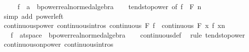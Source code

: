 \begin{isabellebody}
\ \ \ \ \ f\ {\isacharcolon}{\kern0pt}{\isacharcolon}{\kern0pt}\ {\isachardoublequoteopen}{\isacharprime}{\kern0pt}a\ {\isasymRightarrow}\ {\isacharprime}{\kern0pt}b{\isacharcolon}{\kern0pt}{\isacharcolon}{\kern0pt}{\isacharbraceleft}{\kern0pt}power{\isacharcomma}{\kern0pt}real{\isacharunderscore}{\kern0pt}normed{\isacharunderscore}{\kern0pt}algebra{\isacharunderscore}{\kern0pt}{}{\isacharbraceright}{\kern0pt}{\isachardoublequoteclose}\isanewline
%
\isadelimproof
\ \ %
\endisadelimproof
%
\isatagproof
{}\isamarkupfalse%
\ tendsto{\isacharunderscore}{\kern0pt}power\ {\isacharbrackleft}{\kern0pt}of\ f\ {}\ F\ n{\isacharbrackright}{\kern0pt}\ \isamarkupfalse%
\ {\isacharparenleft}{\kern0pt}simp\ add{\isacharcolon}{\kern0pt}\ power{\isacharunderscore}{\kern0pt}{}{\isacharunderscore}{\kern0pt}left{\isacharparenright}{\kern0pt}%
\endisatagproof
{\isafoldproof}%
%
\isadelimproof
\isanewline
%
\endisadelimproof
\isanewline
{}\isamarkupfalse%
\ continuous{\isacharunderscore}{\kern0pt}power\ {\isacharbrackleft}{\kern0pt}continuous{\isacharunderscore}{\kern0pt}intros{\isacharbrackright}{\kern0pt}{\isacharcolon}{\kern0pt}\ {\isachardoublequoteopen}continuous\ F\ f\ {\isasymLongrightarrow}\ continuous\ F\ {\isacharparenleft}{\kern0pt}{\isasymlambda}x{\isachardot}{\kern0pt}\ {\isacharparenleft}{\kern0pt}f\ x{\isacharparenright}{\kern0pt}{\isacharcircum}{\kern0pt}n{\isacharparenright}{\kern0pt}{\isachardoublequoteclose}\isanewline
\ \ \ f\ {\isacharcolon}{\kern0pt}{\isacharcolon}{\kern0pt}\ {\isachardoublequoteopen}{\isacharprime}{\kern0pt}a{\isacharcolon}{\kern0pt}{\isacharcolon}{\kern0pt}t{}{\isacharunderscore}{\kern0pt}space\ {\isasymRightarrow}\ {\isacharprime}{\kern0pt}b{\isacharcolon}{\kern0pt}{\isacharcolon}{\kern0pt}{\isacharbraceleft}{\kern0pt}power{\isacharcomma}{\kern0pt}real{\isacharunderscore}{\kern0pt}normed{\isacharunderscore}{\kern0pt}algebra{\isacharbraceright}{\kern0pt}{\isachardoublequoteclose}\isanewline
%
\isadelimproof
\ \ %
\endisadelimproof
%
\isatagproof
{}\isamarkupfalse%
\ continuous{\isacharunderscore}{\kern0pt}def\ \isamarkupfalse%
\ {\isacharparenleft}{\kern0pt}rule\ tendsto{\isacharunderscore}{\kern0pt}power{\isacharparenright}{\kern0pt}%
\endisatagproof
{\isafoldproof}%
%
\isadelimproof
\isanewline
%
\endisadelimproof
\isanewline
{}\isamarkupfalse%
\ continuous{\isacharunderscore}{\kern0pt}on{\isacharunderscore}{\kern0pt}power\ {\isacharbrackleft}{\kern0pt}continuous{\isacharunderscore}{\kern0pt}intros{\isacharbrackright}{\kern0pt}{\isacharcolon}{\kern0pt}\isanewline

\end{isabellebody}
